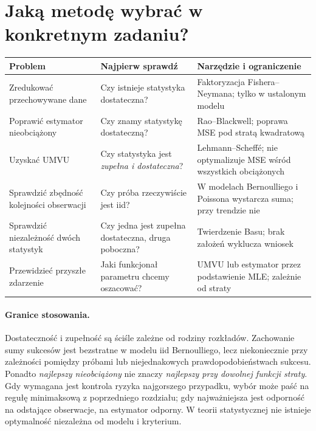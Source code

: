 \section{Jaką metodę wybrać w konkretnym zadaniu?}
\begin{center}\small
\begin{tabular}{>{\raggedright\arraybackslash}p{}>{\raggedright\arraybackslash}p{}>{\raggedright\arraybackslash}p{}}
\toprule
\textbf{Problem} & \textbf{Najpierw sprawdź} & \textbf{Narzędzie i ograniczenie}\\
\midrule
Zredukować przechowywane dane & Czy istnieje statystyka dostateczna? & Faktoryzacja Fishera--Neymana; tylko w ustalonym modelu\\
Poprawić estymator nieobciążony & Czy znamy statystykę dostateczną? & Rao--Blackwell; poprawa MSE pod stratą kwadratową\\
Uzyskać UMVU & Czy statystyka jest \emph{zupełna i dostateczna}? & Lehmann--Scheffé; nie optymalizuje MSE wśród wszystkich obciążonych\\
Sprawdzić zbędność kolejności obserwacji & Czy próba rzeczywiście jest iid? & W modelach Bernoulliego i Poissona wystarcza suma; przy trendzie nie\\
Sprawdzić niezależność dwóch statystyk & Czy jedna jest zupełna dostateczna, druga poboczna? & Twierdzenie Basu; brak założeń wyklucza wniosek\\
Przewidzieć przyszłe zdarzenie & Jaki funkcjonał parametru chcemy oszacować? & UMVU lub estymator przez podstawienie MLE; zależnie od straty\\
\bottomrule
\end{tabular}
\end{center}

\paragraph{Granice stosowania.}
Dostateczność i zupełność są ściśle zależne od rodziny rozkładów.
Zachowanie sumy sukcesów jest bezstratne w modelu iid Bernoulliego,
lecz niekoniecznie przy zależności pomiędzy próbami lub niejednakowych
prawdopodobieństwach sukcesu. Ponadto \emph{najlepszy nieobciążony}
nie znaczy \emph{najlepszy przy dowolnej funkcji straty}.
Gdy wymagana jest kontrola ryzyka najgorszego przypadku,
wybór może paść na regułę minimaksową z poprzedniego rozdziału;
gdy najważniejsza jest odporność na odstające obserwacje,
na estymator odporny. W teorii statystycznej nie istnieje
optymalność niezależna od modelu i kryterium.

